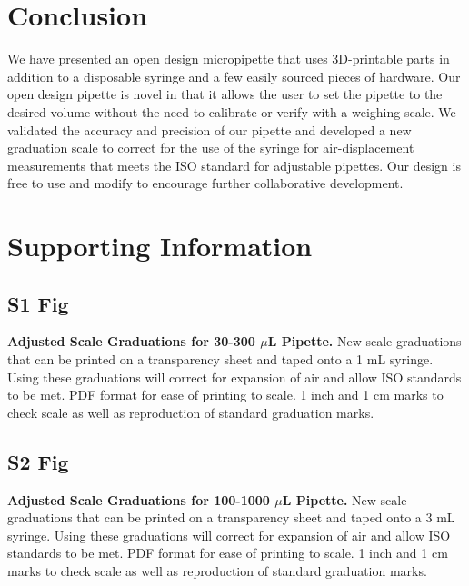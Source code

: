 \documentclass[10pt,letterpaper]{article}
\begin{document}
\section*{Conclusion}
We have presented an open design micropipette that uses 3D-printable parts in addition to a disposable syringe and a few easily sourced pieces of hardware.
Our open design pipette is novel in that it allows the user to set the pipette to the desired volume without the need to calibrate or verify with a weighing scale. 
We validated the accuracy and precision of our pipette and developed a new graduation scale to correct for the use of the syringe for air-displacement measurements that meets the ISO standard for adjustable pipettes.
Our design is free to use and modify to encourage further collaborative development.


\section*{Supporting Information}

\subsection*{S1 Fig}
\label{S1_Fig}
{\bf Adjusted Scale Graduations for 30-300 $\mu$L Pipette.} New scale graduations that can be printed on a transparency sheet and taped onto a 1 mL syringe. Using these graduations will correct for expansion of air and allow ISO standards to be met. PDF format for ease of printing to scale. 1 inch and 1 cm marks to check scale as well as reproduction of standard graduation marks.

\subsection*{S2 Fig}
\label{S2_Fig}
{\bf Adjusted Scale Graduations for 100-1000 $\mu$L Pipette.} New scale graduations that can be printed on a transparency sheet and taped onto a 3 mL syringe. Using these graduations will correct for expansion of air and allow ISO standards to be met. PDF format for ease of printing to scale. 1 inch and 1 cm marks to check scale as well as reproduction of standard graduation marks.

\nolinenumbers



\end{document}
